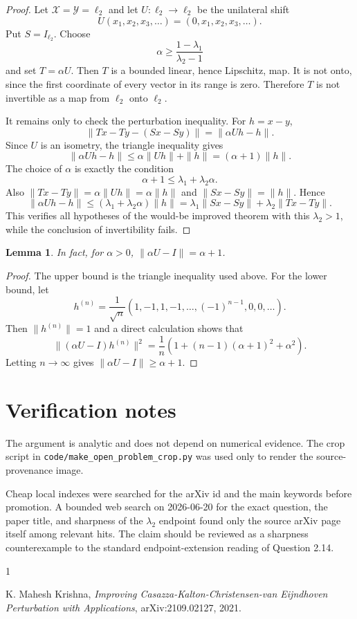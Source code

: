 \documentclass[11pt]{amsart}
\newtheorem{lemma}{Lemma}
\begin{document}
\begin{proof}
Let $\mathcal X=\mathcal Y=\ell_2$ and let $U:\ell_2\to\ell_2$ be the
unilateral shift
\[
U(x_1,x_2,x_3,\ldots)=(0,x_1,x_2,x_3,\ldots).
\]
Put $S=I_{\ell_2}$.  Choose
\[
\alpha\geq \frac{1-\lambda_1}{\lambda_2-1}
\]
and set $T=\alpha U$.  Then $T$ is a bounded linear, hence Lipschitz, map.
It is not onto, since the first coordinate of every vector in its range is
zero.  Therefore $T$ is not invertible as a map from $\ell_2$ onto $\ell_2$.

It remains only to check the perturbation inequality.  For $h=x-y$,
\[
\|Tx-Ty-(Sx-Sy)\|=\|\alpha Uh-h\|.
\]
Since $U$ is an isometry, the triangle inequality gives
\[
\|\alpha Uh-h\|\leq \alpha\|Uh\|+\|h\|=(\alpha+1)\|h\|.
\]
The choice of $\alpha$ is exactly the condition
\[
\alpha+1\leq \lambda_1+\lambda_2\alpha.
\]
Also $\|Tx-Ty\|=\alpha\|Uh\|=\alpha\|h\|$ and
$\|Sx-Sy\|=\|h\|$.  Hence
\[
\|\alpha Uh-h\|
\leq(\lambda_1+\lambda_2\alpha)\|h\|
=\lambda_1\|Sx-Sy\|+\lambda_2\|Tx-Ty\|.
\]
This verifies all hypotheses of the would-be improved theorem with this
$\lambda_2>1$, while the conclusion of invertibility fails.
\end{proof}

\begin{lemma}
In fact, for $\alpha>0$, $\|\alpha U-I\|=\alpha+1$.
\end{lemma}

\begin{proof}
The upper bound is the triangle inequality used above.  For the lower bound,
let
\[
h^{(n)}=\frac{1}{\sqrt n}(1,-1,1,-1,\ldots,(-1)^{n-1},0,0,\ldots).
\]
Then $\|h^{(n)}\|=1$ and a direct calculation shows that
\[
\|(\alpha U-I)h^{(n)}\|^2
=\frac{1}{n}\left(1+(n-1)(\alpha+1)^2+\alpha^2\right).
\]
Letting $n\to\infty$ gives $\|\alpha U-I\|\geq \alpha+1$.
\end{proof}

\section*{Verification notes}

The argument is analytic and does not depend on numerical evidence.  The crop
script in \texttt{code/make\_open\_problem\_crop.py} was used only to render
the source-provenance image.

Cheap local indexes were searched for the arXiv id and the main keywords
before promotion.  A bounded web search on 2026-06-20 for the exact question,
the paper title, and sharpness of the $\lambda_2$ endpoint found only the
source arXiv page itself among relevant hits.  The claim should be reviewed as
a sharpness counterexample to the standard endpoint-extension reading of
Question 2.14.

\begin{thebibliography}{1}

K. Mahesh Krishna,
\emph{Improving Casazza-Kalton-Christensen-van Eijndhoven Perturbation with Applications},
arXiv:2109.02127, 2021.

\end{thebibliography}
\end{document}
